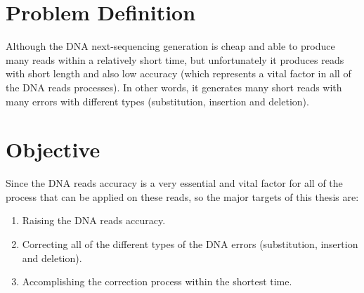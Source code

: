 \documentclass{llncs}
\begin{document}

\newpage
\chapter*{Problem Definition}
Although the DNA next-sequencing generation is cheap and able to produce many reads within a relatively short time, but unfortunately it produces reads with short length and also low accuracy (which represents a vital factor in all of the DNA reads processes). In other words, it generates many short reads with many errors with different types (substitution, insertion and deletion).
%

\chapter*{Objective}
Since the DNA reads accuracy is a very essential and vital factor for all of the process that can be applied on these reads, so the major targets of this thesis are:
\begin{enumerate}
   \item Raising the DNA reads accuracy.

   \item Correcting all of the different types of the DNA errors (substitution, insertion and deletion).

   \item Accomplishing the correction process within the shortest time.
\end{enumerate}

\newpage
{}
\tableofcontents

\newpage
\end{document}
